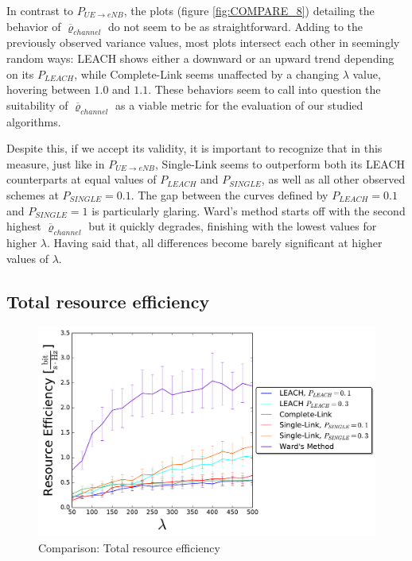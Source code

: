 In contrast to $P_{UE\rightarrow eNB}$, the plots (figure \ref{fig:COMPARE_8}) detailing the behavior of $\overline{\varrho}_{channel}$ do not seem to be as straightforward. Adding to the previously observed variance values, most plots intersect each other in seemingly random ways: LEACH shows either a downward or an upward trend depending on its $P_{LEACH}$, while Complete-Link seems unaffected by a changing $\lambda$ value, hovering between $1.0$ and $1.1$. These behaviors seem to call into question the suitability of $\overline{\varrho}_{channel}$ as a viable metric for the evaluation of our studied algorithms. 

Despite this, if we accept its validity, it is important to recognize that in this measure, just like in $P_{UE\rightarrow eNB}$, Single-Link seems to outperform both its LEACH counterparts at equal values of $P_{LEACH}$ and $P_{SINGLE}$, as well as all other observed schemes at $P_{SINGLE} = 0.1$. The gap between the curves defined by $P_{LEACH} = 0.1$ and $P_{SINGLE} = 1$ is particularly glaring. Ward's method starts off with the second highest $\overline{\varrho}_{channel}$ but it quickly degrades, finishing with the lowest values for higher $\lambda$. Having said that, all differences become barely significant at higher values of $\lambda$.

\subsection{Total resource efficiency}

\begin{figure}[H]
\centering
\captionsetup{justification=centering}
\includegraphics[width=1\linewidth]{figures/COMPARE_9}
\caption{Comparison: Total resource efficiency}
\label{fig:COMPARE_9}
\end{figure}


